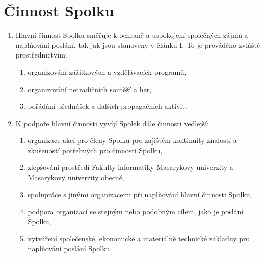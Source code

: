 \documentclass[11pt,a4paper]{article}
\begin{document}
\section{Činnost Spolku}
\begin{enumerate}[itemsep=0pt]
    \item Hlavní činnost Spolku směřuje k ochraně a uspokojení společných zájmů 
    a naplňování poslání, tak jak jsou stanoveny v článku I. To je prováděno 
    zvláště prostřednictvím: 
    \begin{enumerate}[itemsep=0pt,topsep=0pt]
        \item organizování zážitkových a vzdělávacích programů,
        \item organizování netradičních soutěží a her,
        \item pořádání přednášek a dalších propagačních aktivit.
    \end{enumerate}
    \item K podpoře hlavní činnosti vyvíjí Spolek dále činnosti vedlejší: 
    \begin{enumerate}[itemsep=0pt,topsep=0pt]
        \item organizace akcí pro členy Spolku pro zajištění kontinuity znalostí
         a zkušeností potřebných pro činnosti Spolku,
        \item zlepšování prostředí Fakulty informatiky Masarykovy univerzity a Masarykovy univerzity obecně,
        \item spolupráce s jinými organizacemi při naplňování hlavní činnosti 
        Spolku,
        \item podpora organizací se stejným nebo podobným cílem, jako je 
        poslání Spolku,
        \item vytváření společenské, ekonomické a materiálně technické 
        základny pro naplňování poslání Spolku.
    \end{enumerate}
\end{enumerate}
\end{document}
